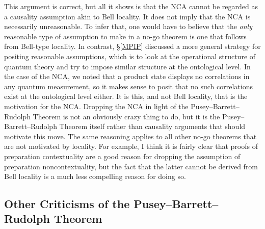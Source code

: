 \documentclass[DIV=calc,paper=a4,fontsize=11pt,twocolumn]{scrartcl} %
\theoremstyle{definition}
\theoremstyle{plain}
\begin{document}
This argument is correct, but all it shows is that the NCA cannot be
regarded as a causality assumption akin to Bell locality.  It does not
imply that the NCA is necessarily unreasonable.  To infer that, one
would have to believe that the \emph{only} reasonable type of
assumption to make in a no-go theorem is one that follows from
Bell-type locality.  In contrast, \S\ref{MPIP} discussed a more
general strategy for positing reasonable assumptions, which is to look
at the operational structure of quantum theory and try to impose
similar structure at the ontological level.  In the case of the NCA,
we noted that a product state displays no correlations in any quantum
measurement, so it makes sense to posit that no such correlations
exist at the ontological level either.  It is this, and not Bell
locality, that is the motivation for the NCA\@.  Dropping the NCA in
light of the Pusey--Barrett--Rudolph Theorem is not an obviously crazy thing to do, but it
is the Pusey--Barrett--Rudolph Theorem itself rather than causality arguments that should
motivate this move.  The same reasoning applies to all other no-go
theorems that are not motivated by locality.  For example, I think it
is fairly clear that proofs of preparation contextuality are a good
reason for dropping the assumption of preparation noncontextuality,
but the fact that the latter cannot be derived from Bell locality is a
much less compelling reason for doing so.

\subsection{Other Criticisms of the Pusey--Barrett--Rudolph Theorem}

\label{OCPusey--Barrett--Rudolph}
\end{document}
